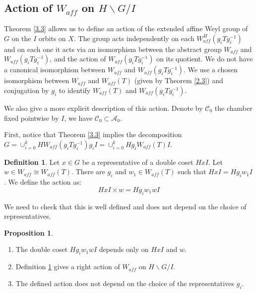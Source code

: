 \documentclass[12pt]{article}
\newcommand{\A}{\mathcal{A}}
\newcommand{\C}{\mathcal{C}}
\newcommand{\<}{\langle}
\renewcommand{\>}{\rangle}
\theoremstyle{plain}
\theoremstyle{definition}
\newtheorem{prop}[theorem]{Proposition}
\newtheorem{defn}[theorem]{Definition} %
\begin{document}
\subsection{Action of $W_{aff}$ on $H\backslash G/I$}\label{the action section}

Theorem \ref{3.3} allows us to define an action of the extended affine Weyl group of $G$ on the $I$ orbits on $X$. The group acts independently on each $W^H_{aff}(g_iTg_i^{-1})$ and on each one it acts via an isomorphism between the abstract group $W_{aff}$ and $W_{aff}(g_iTg_i^{-1})$, and the action of $W_{aff}(g_iTg_i^{-1})$ on its quotient. We do not have a canonical isomorphism between $W_{aff}$ and $W_{aff}(g_iTg_i^{-1})$. We use a chosen isomorphism between $W_{aff}$ and $W_{aff}(T)$ (given by Theorem \ref{2.3}) and conjugation by $g_i$ to identify $W_{aff}(T)$ and $W_{aff}(g_iTg_i^{-1})$.


We also give a more explicit description of this action. Denote by $\C_0$ the chamber fixed pointwise by $I$, we have $\C_0\subset\A_0$.

First, notice that Theorem \ref{3.3} implies the decomposition $G=\cup_{i=0}^k HW_{aff}(g_iTg_i^{-1})g_iI=\cup_{i=0}^k Hg_iW_{aff}(T)I$.

\begin{defn}\label{the action}
    Let $x\in G$ be a representative of a double coset $HxI$. Let $w\in W_{aff}\cong W_{aff}(T)$. There are $g_i$ and $w_1\in W_{aff}(T)$ such that $HxI=Hg_iw_1I$. We define the action as: $$HxI\times w=Hg_iw_1wI$$
\end{defn}

We need to check that this is well defined and does not depend on the choice of representatives.


\begin{prop}
    \begin{enumerate}
        \item The double coset $Hg_iw_1wI$ depends only on $HxI$ and $w$.
        \item Definition \ref{the action} gives a right action of $W_{aff}$ on $H\backslash G/I$.
        \item The defined action does not depend on the choice of the representatives $g_i$.
    \end{enumerate}
   
\end{prop}
\end{document}
